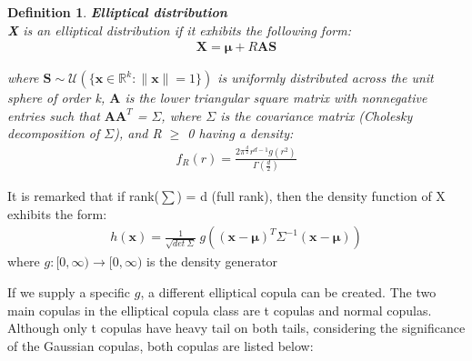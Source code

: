 \documentclass[12pt]{report}
\newtheorem{definition}{Definition}[subsection]
\newcommand{\1}{\mathbf{1}}
\begin{document}
\begin{definition}\label{EllipticalDistribution}
\textit{\normalfont\parencite{HofertBook}}
\:\textbf{Elliptical distribution} \\

\textbf{X} is an elliptical distribution if it exhibits the following form: \\
\vspace{-0.8cm}
\begin{align*}
\boldsymbol{X} = \boldsymbol{\mu} + R\boldsymbol{A}\boldsymbol{S}
\end{align*}

where $\boldsymbol{S} \sim \mathcal{U}( \{ \boldsymbol{x} \in \mathbb{R}^{k} : \|\boldsymbol{x}\| = 1 \} )$ is uniformly distributed across the unit sphere of order k, $\boldsymbol{A}$ is the lower triangular square matrix with nonnegative entries such that $\boldsymbol{A}\boldsymbol{A}^{T}$ = $\Sigma$, where $\Sigma$ is the covariance matrix (Cholesky decomposition of $\Sigma$), and R $\ge$ 0 having a density:
\begin{align*}
f_{R}(r) = \frac{2 \pi^{\frac{d}{2}} r^{d-1} g(r^{2})}{\Gamma(\frac{d}{2})}
\end{align*}
\end{definition}

It is remarked that if rank($\sum$) = d (full rank), then the density function of X exhibits the form: \\

\begin{align*}
h(\boldsymbol{x}) = \frac{1}{\sqrt{det \: \Sigma}} \: g \left( (\boldsymbol{x} - \boldsymbol{\mu})^{T} \Sigma^{-1} (\boldsymbol{x} - \boldsymbol{\mu})  \right)
\end{align*}
where $g : [0,\infty) \rightarrow [0,\infty)$ is the density generator

If we supply a specific $g$, a different elliptical copula can be created. The two main copulas in the elliptical copula class are t copulas and normal copulas. Although only t copulas have heavy tail on both tails, considering the significance of the Gaussian copulas, both copulas are listed below: \\
\end{document}
